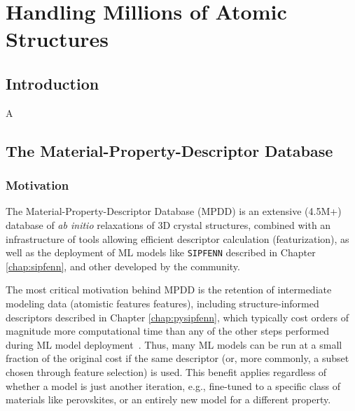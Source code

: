 \chapter{Handling Millions of Atomic Structures} \label{chap:mpdd}



\section{Introduction} \label{mpdd:sec:background}

A



\section{The Material-Property-Descriptor Database} \label{mpdd:sec:mpdd}

\subsection{Motivation} \label{mpdd:ssec:motivation}

The Material-Property-Descriptor Database (MPDD) is an extensive (4.5M+) database of \emph{ab initio} relaxations of 3D crystal structures,  combined with an infrastructure of tools allowing efficient descriptor calculation (featurization), as well as the deployment of ML models like \texttt{SIPFENN} \cite{Krajewski2024EfficientStructures} described in Chapter \ref{chap:sipfenn}, and other developed by the community.

The most critical motivation behind MPDD is the retention of intermediate modeling data (atomistic features features), including structure-informed descriptors described in Chapter \ref{chap:pysipfenn}, which typically cost orders of magnitude more computational time than any of the other steps performed during ML model deployment~\cite{Krajewski2022ExtensibleNetworks}. Thus, many ML models can be run at a small fraction of the original cost if the same descriptor (or, more commonly, a subset chosen through feature selection) is used. This benefit applies regardless of whether a model is just another iteration, e.g., fine-tuned to a specific class of materials like perovskites, or an entirely new model for a different property.

